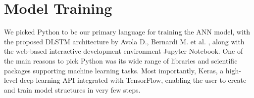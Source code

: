 \section{Model Training}

We picked Python to be our primary language for training the ANN model, with the proposed DLSTM architecture by Avola D., Bernardi M. et al. \cite{avola}, along with the web-based interactive development environment Jupyter Notebook. One of the main reasons to pick Python was its wide range of libraries and scientific packages supporting machine learning tasks. Most importantly, Keras, a high-level deep learning API integrated with TensorFlow, enabling the user to create and train model structures in very few steps.
